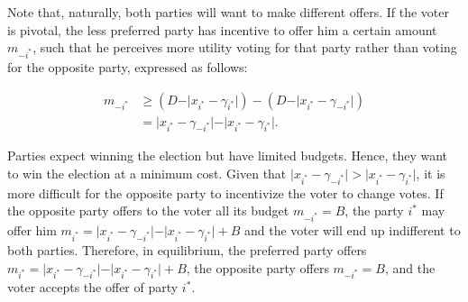 Note that, naturally, both parties will want to make different offers. If the voter is pivotal, the less preferred party has incentive to offer him a certain amount $m_{-i^*}$, such that he perceives more utility voting for that party rather than voting for the opposite party, expressed as follows:

\begin{equation}
\begin{aligned}
    m_{-i^*} &\geq \left( D-\vert x_{i^*}-\gamma_{i^*} \vert \right) - \left( D-\vert x_{i^*}-\gamma_{-i^*} \vert \right)\\
     &=\vert x_{i^*}-\gamma_{-i^*} \vert- \vert x_{i^*}-\gamma_{i^*} \vert . 
\end{aligned}
\end{equation}

Parties expect winning the election but have limited budgets. Hence, they want to win the election at a minimum cost. Given that $\vert x_{i^*}-\gamma_{-i^*} \vert >\vert x_{i^*}-\gamma_{i^*} \vert$, it is more difficult for the opposite party to incentivize the voter to change votes. If the opposite party offers to the voter all its budget $m_{-i^*}=B$, the party $i^*$ may offer him $m_{i^*}=\vert x_{i^*}-\gamma_{-i^*} \vert- \vert x_{i^*}-\gamma_{i^*} \vert+B$ and the voter will end up indifferent to both parties. Therefore, in equilibrium, the preferred party offers $m_{i^*}=\vert x_{i^*}-\gamma_{-i^*} \vert- \vert x_{i^*}-\gamma_{i^*} \vert+B$, the opposite party offers $m_{-i^*}=B$, and the voter accepts the offer of party $i^*$.


